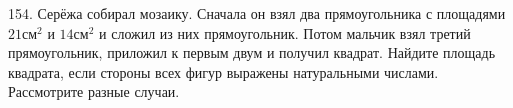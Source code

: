 154. Серёжа собирал мозаику. Сначала он взял два прямоугольника с площадями $21\text{см}^2$ и $14\text{см}^2$ и сложил из них прямоугольник. Потом мальчик взял третий прямоугольник, приложил к первым двум и получил квадрат. Найдите площадь квадрата, если стороны всех фигур выражены натуральными числами. Рассмотрите разные случаи.\\
